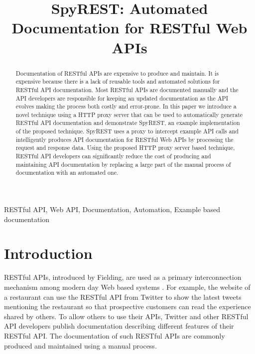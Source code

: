 \documentclass[conference]{IEEEtran}
\begin{document}
\title{SpyREST: Automated Documentation for RESTful Web APIs}


\author{
}
\maketitle


\begin{abstract}
Documentation of RESTful APIs are expensive to produce and maintain. It is expensive because there is a lack of reusable tools and automated solutions for RESTful API documentation. Most RESTful APIs are documented manually and the API developers are responsible for keeping an updated documentation as the API evolves making the process both costly and error-prone. In this paper we introduce a novel technique using a HTTP proxy server that can be used to automatically generate RESTful API documentation and demonstrate SpyREST, an example implementation of the proposed technique. SpyREST uses a proxy to intercept example API calls and intelligently produces API documentation for RESTful Web APIs by processing the request and response data. Using the proposed HTTP proxy server based technique, RESTful API developers can significantly reduce the cost of producing and maintaining API documentation by replacing a large part of the manual process of documentation with an automated one.
\end{abstract}

\IEEEpeerreviewmaketitle

\begin{IEEEkeywords}
RESTful API, Web API, Documentation, Automation, Example based documentation
\end{IEEEkeywords}


\section{Introduction}
RESTful APIs, introduced by Fielding, are used as a primary interconnection mechanism among modern day Web based systems \cite{Fielding_rest}. For example, the website of a restaurant can use the RESTful API from Twitter to show the latest tweets mentioning the restaurant so that prospective customers can read the experience shared by others. To allow others to use their APIs, Twitter and other RESTful API developers publish documentation describing different features of their RESTful API. The documentation of such RESTful APIs are commonly produced and maintained using a manual process.
\end{document}
